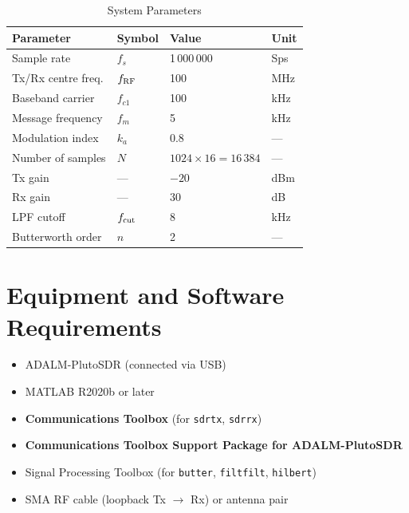\documentclass[12pt,a4paper]{article}
\begin{document}
\begin{table}[H]
  \centering
  \caption{System Parameters}
  \label{tab:params}
  \begin{tabular}{llll}
    \toprule
    \textbf{Parameter} & \textbf{Symbol} & \textbf{Value} & \textbf{Unit} \\
    \midrule
    Sample rate           & $f_s$          & 1\,000\,000  & Sps   \\
    Tx/Rx centre freq.    & $f_{\rm RF}$   & 100          & MHz   \\
    Baseband carrier      & $f_{c1}$       & 100          & kHz   \\
    Message frequency     & $f_m$          & 5            & kHz   \\
    Modulation index      & $k_a$          & 0.8          & ---   \\
    Number of samples     & $N$            & $1024\times16 = 16\,384$ & ---   \\
    Tx gain               & ---            & $-20$        & dBm   \\
    Rx gain               & ---            & 30           & dB    \\
    LPF cutoff            & $f_{\rm cut}$  & 8            & kHz   \\
    Butterworth order     & $n$            & 2            & ---   \\
    \bottomrule
  \end{tabular}
\end{table}

\section{Equipment and Software Requirements}

\begin{itemize}
  \item ADALM-PlutoSDR (connected via USB)
  \item MATLAB R2020b or later
  \item \textbf{Communications Toolbox} (for \texttt{sdrtx}, \texttt{sdrrx})
  \item \textbf{Communications Toolbox Support Package for ADALM-PlutoSDR}
  \item Signal Processing Toolbox (for \texttt{butter}, \texttt{filtfilt},
        \texttt{hilbert})
  \item SMA RF cable (loopback Tx $\rightarrow$ Rx) or antenna pair
\end{itemize}
\end{document}
